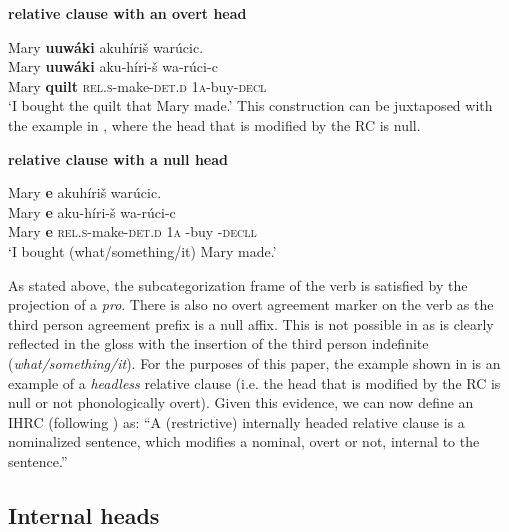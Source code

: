 \documentclass[output=paper]{LSP/langsci}
\begin{document}
\ea \textbf{ relative clause with an overt head} \label{boyle9}

\glll Mary \textbf{uuw\'aki} akuh\'iri\v{s} war\'ucic.\\
Mary \textbf{uuw\'aki} aku-h\'iri-\v{s}      wa-r\'uci-c\\
Mary \textbf{quilt} \textsc{rel.s}-make-\textsc{det.d} \textsc{1a}-buy-\textsc{decl} \\
\trans `I bought the quilt that Mary made.' 	
\z
This construction can be juxtaposed with the example in , where the head that is modified by the RC is null.

\ea \textbf{ relative clause with a null head} \label{boyle10}

\glll Mary \textbf{e} akuh\'iri\v{s} war\'ucic.\\
Mary \textbf{e} aku-h\'iri-\v{s}   wa-r\'uci-c\\
Mary \textbf{e} \textsc{rel.s}-make-\textsc{det.d} \textsc{1a} -buy -\textsc{decll}\\ 
\trans `I bought (what/something/it) Mary made.'
\z

As stated above, the subcategorization frame of the verb is satisfied by the projection of a \textit{pro}. There is also no overt agreement marker on the verb as the third person agreement prefix is a null affix. This is not possible in  as is clearly reflected in the gloss with the insertion of the  third person indefinite (\textit{what/something/it}). For the purposes of this paper, the example shown in  is an example of a \textit{headless} relative clause (i.e. the head that is modified by the RC is null or not phonologically overt). Given this evidence, we can now define an IHRC (following \citealt[27]{Culy1990}) as: ``A (restrictive) internally headed relative clause is a nominalized sentence, which modifies a nominal, overt or not, internal to the sentence.'' 

\subsection{Internal heads}\label{sec:boyle:3.1}
\end{document}
